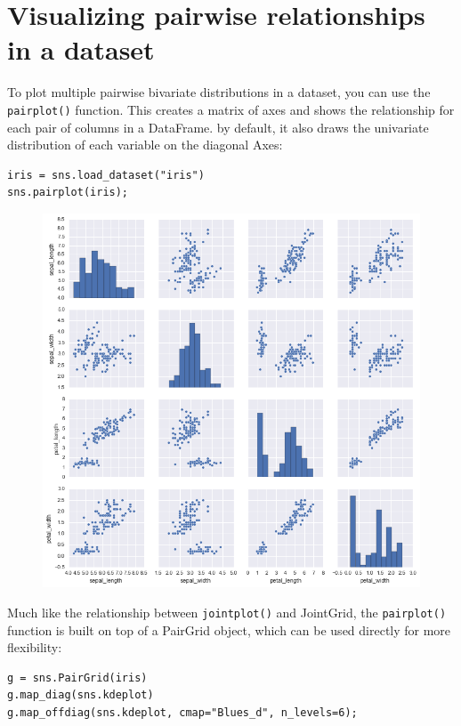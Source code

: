 \documentclass{beamer}
\begin{document}
\section{Visualizing pairwise relationships in a dataset}
\begin{frame}[fragile]
To plot multiple pairwise bivariate distributions in a dataset, you can use the \texttt{pairplot()} function. This creates a matrix of axes and shows the relationship for each pair of columns in a DataFrame. by default, it also draws the univariate distribution of each variable on the diagonal Axes:
\begin{verbatim}
iris = sns.load_dataset("iris")
sns.pairplot(iris);
\end{verbatim}
\end{frame}
\begin{frame}
\begin{figure}
\centering
\includegraphics[width=0.8\linewidth]{images/distributions_42_0}
\caption{}
\label{fig:distributions_42_0}
\end{figure}

\end{frame}
\begin{frame}[fragile]
	\large
Much like the relationship between \texttt{jointplot()} and JointGrid, the \texttt{pairplot()} function is built on top of a PairGrid object, which can be used directly for more flexibility:
\begin{framed}
\begin{verbatim}
g = sns.PairGrid(iris)
g.map_diag(sns.kdeplot)
g.map_offdiag(sns.kdeplot, cmap="Blues_d", n_levels=6);
\end{verbatim}
\end{framed}
\end{frame}
\end{document}
